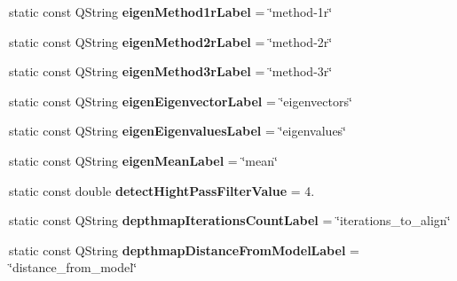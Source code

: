 \begin{DoxyCompactItemize}
\item 
\hypertarget{class_common_acd04ec924d1f42b800746d9a0ca25979}{static const Q\+String {\bfseries eigen\+Method1r\+Label} = \char`\"{}method-\/1r\char`\"{}}\label{class_common_acd04ec924d1f42b800746d9a0ca25979}

\item 
\hypertarget{class_common_a1c5803b985f7876b9be128602871a1c2}{static const Q\+String {\bfseries eigen\+Method2r\+Label} = \char`\"{}method-\/2r\char`\"{}}\label{class_common_a1c5803b985f7876b9be128602871a1c2}

\item 
\hypertarget{class_common_aab885033b4803b677fd2e9cb3b4c0589}{static const Q\+String {\bfseries eigen\+Method3r\+Label} = \char`\"{}method-\/3r\char`\"{}}\label{class_common_aab885033b4803b677fd2e9cb3b4c0589}

\item 
\hypertarget{class_common_a85fd4b71fd146e508bd191548214b49c}{static const Q\+String {\bfseries eigen\+Eigenvector\+Label} = \char`\"{}eigenvectors\char`\"{}}\label{class_common_a85fd4b71fd146e508bd191548214b49c}

\item 
\hypertarget{class_common_abcc134a899f75399ae26b60a2bf4104c}{static const Q\+String {\bfseries eigen\+Eigenvalues\+Label} = \char`\"{}eigenvalues\char`\"{}}\label{class_common_abcc134a899f75399ae26b60a2bf4104c}

\item 
\hypertarget{class_common_a5558bd04b7e9ac1de60165eaa596b500}{static const Q\+String {\bfseries eigen\+Mean\+Label} = \char`\"{}mean\char`\"{}}\label{class_common_a5558bd04b7e9ac1de60165eaa596b500}

\item 
\hypertarget{class_common_a86d8764339fb01780df826b4c95d7da2}{static const double {\bfseries detect\+Hight\+Pass\+Filter\+Value} = 4.}\label{class_common_a86d8764339fb01780df826b4c95d7da2}

\item 
\hypertarget{class_common_a29111ac4af23620b6a17bed5fd99258a}{static const Q\+String {\bfseries depthmap\+Iterations\+Count\+Label} = \char`\"{}iterations\+\_\+to\+\_\+align\char`\"{}}\label{class_common_a29111ac4af23620b6a17bed5fd99258a}

\item 
\hypertarget{class_common_a6811927964c06e16fcfacab4f77923e7}{static const Q\+String {\bfseries depthmap\+Distance\+From\+Model\+Label} = \char`\"{}distance\+\_\+from\+\_\+model\char`\"{}}\label{class_common_a6811927964c06e16fcfacab4f77923e7}


\end{DoxyCompactItemize}
